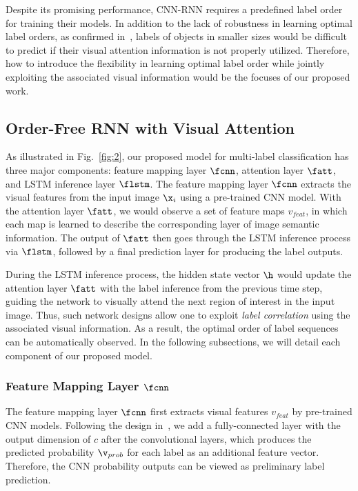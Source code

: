 \documentclass[letterpaper]{article} %
\begin{document}
Despite its promising performance, CNN-RNN requires a predefined label order for training their models. In addition to the lack of robustness in learning optimal label orders, as confirmed in~\cite{wang2016cnn}, labels of objects in smaller sizes would be difficult to predict if their visual attention information is not properly utilized. Therefore, how to introduce the flexibility in learning optimal label order while jointly exploiting the associated visual information would be the focuses of our proposed work.

\subsection{Order-Free RNN with Visual Attention}
As illustrated in Fig.~\ref{fig:2}, our proposed model for multi-label classification has three major components: feature mapping layer $\fcnn$, attention layer $\fatt$, and LSTM inference layer $\flstm$. The feature mapping layer $\fcnn$ extracts the visual features from the input image $\x_i$ using a pre-trained CNN model. With the attention layer $\fatt$, we would observe a set of feature maps $v_{feat}$, in which each map is learned to describe the corresponding layer of image semantic information. The output of $\fatt$ then goes through the LSTM inference process via $\flstm$, followed by a final prediction layer for producing the label outputs.

During the LSTM inference process, the hidden state vector $\h$ would update the attention layer $\fatt$ with the label inference from the previous time step, guiding the network to visually attend the next region of interest in the input image. Thus, such network designs allow one to exploit \emph{label correlation} using the associated visual information. As a result, the optimal order of label sequences can be automatically observed. In the following subsections, we will detail each component of our proposed model.\\

\subsubsection{Feature Mapping Layer $\fcnn$}

The feature mapping layer $\fcnn$ first extracts visual features $v_{feat}$ by pre-trained CNN models. Following the design in~\cite{liu2016semantic}, we add a fully-connected layer with the output dimension of $c$ after the convolutional layers, which produces the predicted probability $\v_{prob}$ for each label as an additional feature vector. Therefore, the CNN probability outputs can be viewed as preliminary label prediction.
\end{document}
